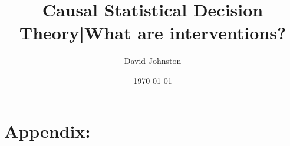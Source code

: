 \documentclass{article}
\title{Causal Statistical Decision Theory|What are interventions?}
\date{\today}
\author{ David Johnston }
\theoremstyle{plain}
\theoremstyle{definition}
\begin{document}
\maketitle


\tableofcontents













\appendix
\newpage
\section*{Appendix:}

% 
\end{document}
